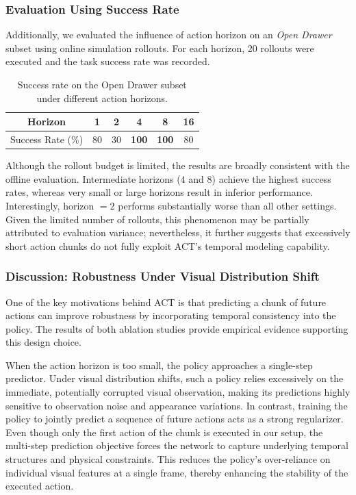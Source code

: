\subsubsection{Evaluation Using Success Rate}

Additionally, we evaluated the influence of action horizon on an \textit{Open Drawer} subset using online simulation rollouts. For each horizon, 20 rollouts were executed and the task success rate was recorded.

\begin{table}[h]
\centering
\caption{Success rate on the Open Drawer subset under different action horizons.}
\label{tab:open_drawer_horizon}
\begin{tabular}{c|ccccc}
\hline
Horizon & 1 & 2 & 4 & 8 & 16 \\
\hline
Success Rate (\%) & 80 & 30 & \textbf{100} & \textbf{100} & 80 \\
\hline
\end{tabular}
\end{table}

Although the rollout budget is limited, the results are broadly consistent with the offline evaluation. Intermediate horizons ($4$ and $8$) achieve the highest success rates, whereas very small or large horizons result in inferior performance. Interestingly, horizon $=2$ performs substantially worse than all other settings. Given the limited number of rollouts, this phenomenon may be partially attributed to evaluation variance; nevertheless, it further suggests that excessively short action chunks do not fully exploit ACT's temporal modeling capability.

\subsubsection{Discussion: Robustness Under Visual Distribution Shift}

One of the key motivations behind ACT is that predicting a chunk of future actions can improve robustness by incorporating temporal consistency into the policy. The results of both ablation studies provide empirical evidence supporting this design choice.

When the action horizon is too small, the policy approaches a single-step predictor. Under visual distribution shifts, such a policy relies excessively on the immediate, potentially corrupted visual observation, making its predictions highly sensitive to observation noise and appearance variations. In contrast, training the policy to jointly predict a sequence of future actions acts as a strong regularizer. Even though only the first action of the chunk is executed in our setup, the multi-step prediction objective forces the network to capture underlying temporal structures and physical constraints. This reduces the policy's over-reliance on individual visual features at a single frame, thereby enhancing the stability of the executed action.

